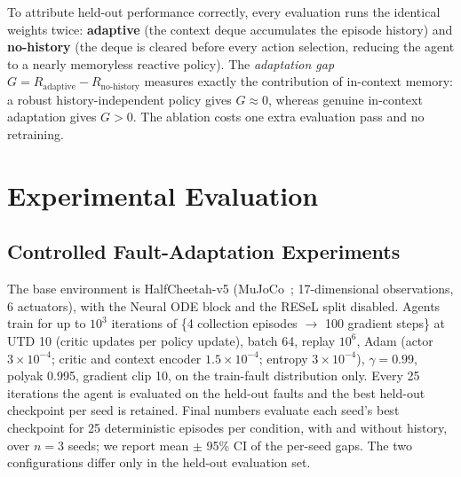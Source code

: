 \documentclass[conference]{IEEEtran}
\begin{document}
To attribute held-out performance correctly, every evaluation runs the identical weights twice: \textbf{adaptive} (the context deque accumulates the episode history) and \textbf{no-history} (the deque is cleared before every action selection, reducing the agent to a nearly memoryless reactive policy). The \emph{adaptation gap} $G = R_{\text{adaptive}} - R_{\text{no-history}}$ measures exactly the contribution of in-context memory: a robust history-independent policy gives $G \approx 0$, whereas genuine in-context adaptation gives $G > 0$. The ablation costs one extra evaluation pass and no retraining.



\section{Experimental Evaluation}

\label{sec:experiments}



\subsection{Controlled Fault-Adaptation Experiments}

\label{sec:fault_exp}

The base environment is HalfCheetah-v5 (MuJoCo~\cite{mujoco}; 17-dimensional observations, 6 actuators), with the Neural ODE block and the RESeL split disabled. Agents train for up to $10^3$ iterations of \{4 collection episodes $\rightarrow$ 100 gradient steps\} at UTD 10 (critic updates per policy update), batch 64, replay $10^6$, Adam (actor $3{\times}10^{-4}$; critic and context encoder $1.5{\times}10^{-4}$; entropy $3{\times}10^{-4}$), $\gamma = 0.99$, polyak 0.995, gradient clip 10, on the train-fault distribution only. Every 25 iterations the agent is evaluated on the held-out faults and the best held-out checkpoint per seed is retained. Final numbers evaluate each seed's best checkpoint for 25 deterministic episodes per condition, with and without history, over $n = 3$ seeds; we report mean $\pm$ 95\% CI of the per-seed gaps. The two configurations differ only in the held-out evaluation set.
\end{document}
